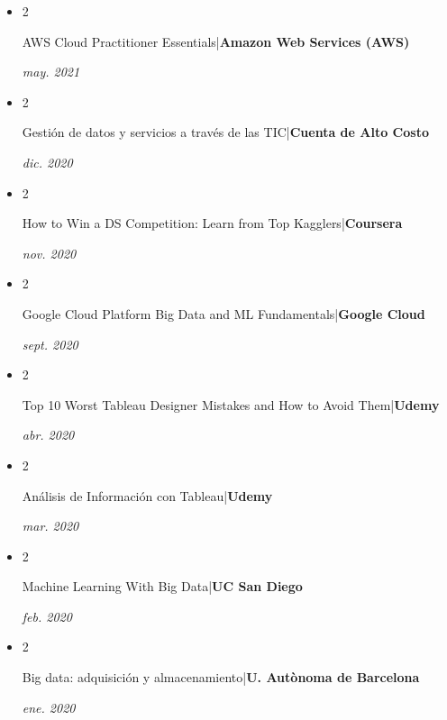 \documentclass[10pt, letterpaper]{article}
\newenvironment{highlights}{
    \begin{itemize}[
        topsep=0.10 cm,
        parsep=0.10 cm,
        partopsep=0pt,
        itemsep=0pt,
        leftmargin=0.4 cm + 10pt
    ]
}{
    \end{itemize}
} %
\newenvironment{twocolentry}[2][]{
    \onecolentry
    \def\secondColumn{#2}
    \setcolumnwidth{\fill, 4.5 cm}
    \begin{paracol}{2}
}{
    \switchcolumn \raggedleft \secondColumn
    \end{paracol}
    \endonecolentry
} %
\begin{document}
        \begin{highlights}
            
            \item \begin{twocolentry}{
        \textit{may. 2021}}
            AWS Cloud Practitioner Essentials|\textbf{Amazon Web Services (AWS)}
        \end{twocolentry}
		
       \item  \begin{twocolentry}{
        \textit{dic. 2020}}
            Gestión de datos y servicios a través de las TIC|\textbf{Cuenta de Alto Costo}
        \end{twocolentry}
		
       \item  \begin{twocolentry}{
        \textit{nov. 2020}}
            How to Win a DS Competition: Learn from Top Kagglers|\textbf{Coursera}
        \end{twocolentry}
		
        \item \begin{twocolentry}{
        \textit{sept. 2020}}
            Google Cloud Platform Big Data and ML Fundamentals|\textbf{Google Cloud}
        \end{twocolentry}
		
        \item \begin{twocolentry}{
        \textit{abr. 2020}}
            Top 10 Worst Tableau Designer Mistakes and How to Avoid Them|\textbf{Udemy}
        \end{twocolentry}
		
        \item \begin{twocolentry}{
        \textit{mar. 2020}}
            Análisis de Información con Tableau|\textbf{Udemy}
        \end{twocolentry}
		
        \item \begin{twocolentry}{
        \textit{feb. 2020}}
            Machine Learning With Big Data|\textbf{UC San Diego}
        \end{twocolentry}
		
        \item \begin{twocolentry}{
        \textit{ene. 2020}}
            Big data: adquisición y almacenamiento|\textbf{U. Autònoma de Barcelona}
        \end{twocolentry}
		

\end{highlights}
\end{document}
